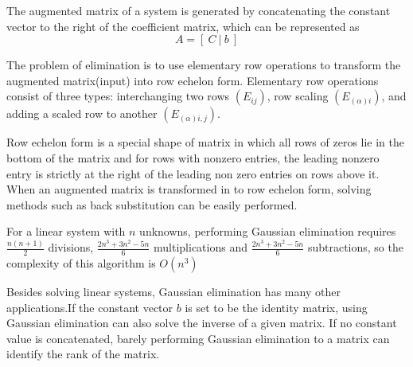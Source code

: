 \documentclass{article}
\begin{document}
The augmented matrix of a system is generated by concatenating the constant vector to the right of the coefficient matrix, which can be represented as $$A = [\ C\ |\ b\ ]$$

The problem of elimination is to use elementary row operations to transform the augmented matrix(input) into row echelon form. Elementary row operations consist of three types: interchanging two rows $(E_{ij})$, row scaling $(E_{(\alpha)i})$, and adding a scaled row to another $(E_{(\alpha)i,j})$. 

Row echelon form is a special shape of matrix in which all rows of zeros lie in the bottom of the matrix and for rows with nonzero entries, the leading nonzero entry is strictly at the right of the leading non zero entries on rows above it. When an augmented matrix is transformed in to row echelon form, solving methods such as back substitution can be easily performed.

For a linear system with $n$ unknowns, performing Gaussian elimination requires $\frac{n(n+1)}{2}$ divisions, $\frac{2n^3+3n^2-5n}{6}$ multiplications and $\frac{2n^3+3n^2-5n}{6}$ subtractions, so the complexity of this algorithm is $O(n^3)$

Besides solving linear systems, Gaussian elimination has many other applications.If the constant vector $b$ is set to be the identity matrix, using Gaussian elimination can also solve the inverse of a given matrix. If no constant value is concatenated, barely performing Gaussian elimination to a matrix can identify the rank of the matrix.

\begin{Algorithm}[Gaussian elimination\label{problem39}]
	\BlankLine
	

\end{Algorithm}
\end{document}
